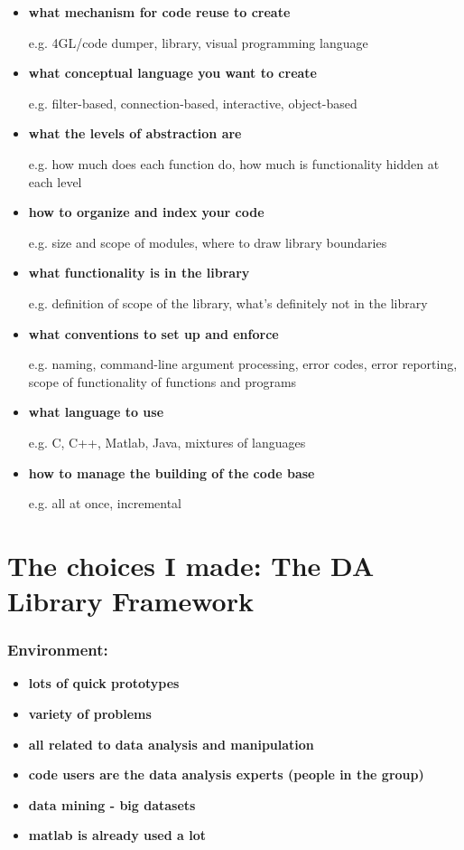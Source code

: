 \begin{itemize}
\item {\bf what mechanism for code reuse to create}

		e.g. 4GL/code dumper, library, visual programming language

\item {\bf what conceptual language you want to create}

		e.g. filter-based, connection-based, interactive, object-based

\item {\bf what the levels of abstraction are}

		e.g. how much does each function do, how much is functionality hidden
			at each level

\item {\bf how to organize and index your code}

		e.g. size and scope of modules, where to draw library boundaries

\item {\bf what functionality is in the library}

		e.g. definition of scope of the library, what's definitely not in the
			library

\item {\bf what conventions to set up and enforce}

		e.g. naming, command-line argument processing, error codes, error 
			reporting, scope of functionality of functions and programs

\item {\bf what language to use}

		e.g. C, C++, Matlab, Java, mixtures of languages

\item {\bf how to manage the building of the code base}

		e.g. all at once, incremental
\end{itemize}


\pagebreak
\part{The choices I made:  The DA Library Framework}

\section*{Environment:}
\begin{itemize}
\item {\bf lots of quick prototypes}
\item {\bf variety of problems}
\item {\bf all related to data analysis and manipulation}
\item {\bf code users are the data analysis experts (people in the group)}
\item {\bf data mining - big datasets}
\item {\bf matlab is already used a lot }
\end{itemize}

